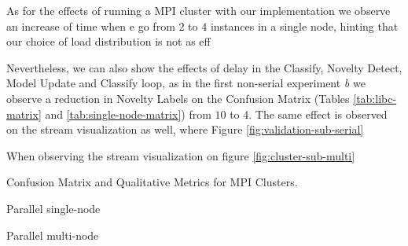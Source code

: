 As for the effects of running a MPI cluster with our implementation
we observe an increase of time when e go from $2$ to $4$ instances in a single
node, hinting that our choice of load distribution is not as eff

Nevertheless, we can also show the effects of delay in the
Classify, Novelty Detect, Model Update and Classify loop, as in the
first non-serial experiment \emph{b} we observe a reduction in Novelty Labels
on the Confusion Matrix (Tables \ref{tab:libc-matrix} and \ref{tab:single-node-matrix})
from $10$ to $4$.
The same effect is observed on the stream visualization as well, where
Figure \ref{fig:validation-sub-serial}


When observing the stream visualization on figure \ref{fig:cluster-sub-multi}

\begin{table}[htb]
\caption{Confusion Matrix and Qualitative Metrics for MPI Clusters.}
\label{tab:confusion-matrixes-single-multi}
\begin{subtable}[h]{0.5\textwidth}\begin{center}
    \caption{Parallel single-node}
    
    \label{tab:single-node-matrix}
\end{center}\end{subtable}
\begin{subtable}[h]{0.5\textwidth}\begin{center}
    \caption{Parallel multi-node}
    
    \label{tab:multi-node-matrix}
\end{center}\end{subtable}
\end{table}


%   

